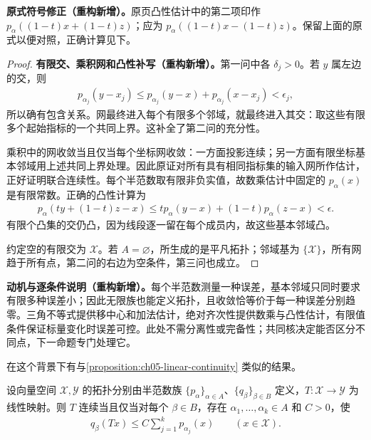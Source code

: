 \documentclass[../../main.tex]{subfiles}
\begin{document}
\begin{remark}
\textbf{原式符号修正（重构新增）。}原页凸性估计中的第二项印作 $p_\alpha((1-t)x+(1-t)z)$；应为 $p_\alpha((1-t)x-(1-t)z)$。保留上面的原式以便对照，正确计算见下。
\end{remark}
\begin{proof}
\textbf{有限交、乘积网和凸性补写（重构新增）。}第一问中各 $\delta_j>0$。若 $y$ 属左边的交，则
\begin{align*}
p_{\alpha_j}(y-x_j)\le p_{\alpha_j}(y-x)+p_{\alpha_j}(x-x_j)<\epsilon_j,
\end{align*}
所以确有包含关系。网最终进入每个有限多个邻域，就最终进入其交：取这些有限多个起始指标的一个共同上界。这补全了第二问的充分性。

乘积中的网收敛当且仅当每个坐标网收敛：一方面投影连续；另一方面有限坐标基本邻域用上述共同上界处理。因此原证对所有具有相同指标集的输入网所作估计，正好证明联合连续性。每个半范数取有限非负实值，故数乘估计中固定的 $p_\alpha(x)$ 是有限常数。正确的凸性计算为
\begin{align*}
p_\alpha(ty+(1-t)z-x)
\le t p_\alpha(y-x)+(1-t)p_\alpha(z-x)<\epsilon.
\end{align*}
有限个凸集的交仍凸，因为线段逐一留在每个成员内，故这些基本邻域凸。

约定空的有限交为 $\mathcal X$。若 $A=\varnothing$，所生成的是平凡拓扑；邻域基为 $\{\mathcal X\}$，所有网趋于所有点，第二问的右边为空条件，第三问也成立。
\end{proof}
\begin{remark}
\textbf{动机与逐条件说明（重构新增）。}每个半范数测量一种误差，基本邻域只同时要求有限多种误差小；因此无限族也能定义拓扑，且收敛恰等价于每一种误差分别趋零。三角不等式提供移中心和加法估计，绝对齐次性提供数乘与凸性估计，有限值条件保证标量变化时误差可控。此处不需分离性或完备性；共同核决定能否区分不同点，下一命题专门处理它。
\end{remark}
在这个背景下有与\cref{proposition:ch05-linear-continuity} 类似的结果。
\begin{proposition}\label{proposition:ch05-seminorm-continuity}
设向量空间 $\mathcal X,\mathcal Y$ 的拓扑分别由半范数族 $\{p_\alpha\}_{\alpha\in A}$、$\{q_\beta\}_{\beta\in B}$ 定义，$T:\mathcal X\to\mathcal Y$ 为线性映射。则 $T$ 连续当且仅当对每个 $\beta\in B$，存在 $\alpha_1,\ldots,\alpha_k\in A$ 和 $C>0$，使
\begin{align*}
q_\beta(Tx)\le C\sum_{j=1}^kp_{\alpha_j}(x)\qquad(x\in\mathcal X).
\end{align*}
\end{proposition}
\end{document}
